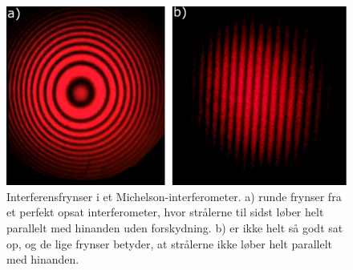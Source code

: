 \documentclass[crop=false, class=memoir]{standalone}
\begin{document}
\begin{figure}
    \centering
    \includegraphics[width=0.45\linewidth]{Laserfysik/billeder/InterferenceFringes.pdf}
    \caption{Interferensfrynser i et Michelson-interferometer. a) runde frynser fra et perfekt opsat interferometer, hvor strålerne til sidst løber helt parallelt med hinanden uden forskydning. b) er ikke helt så godt sat op, og de lige frynser betyder, at strålerne ikke løber helt parallelt med hinanden.}
    \label{laser:fig:frynser}
\end{figure}


\nocite{griffithsIntroductionElectrodynamics2018}
\end{document}
